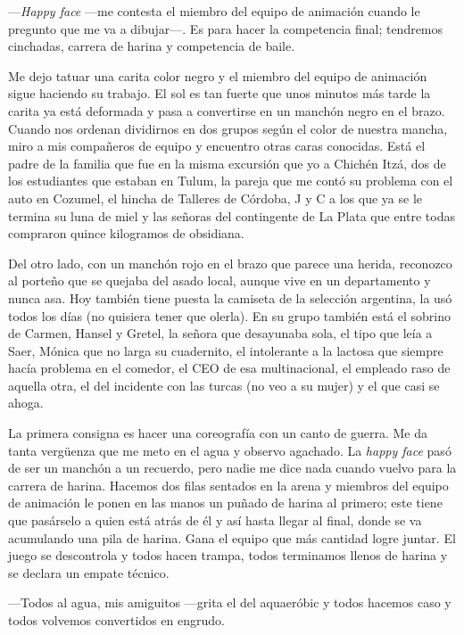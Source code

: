 \documentclass[12pt,twoside,openright,a5paper]{book}
\begin{document}
---\emph{Happy face} ---me contesta el miembro del equipo de animación cuando
le pregunto que me va a dibujar---. Es para hacer la competencia final;
tendremos cinchadas, carrera de harina y competencia de baile.

Me dejo tatuar una carita color negro y el miembro del equipo de animación
sigue haciendo su trabajo. El sol es tan fuerte que unos minutos más tarde
la carita ya está deformada y pasa a convertirse en un manchón negro en el
brazo. Cuando nos ordenan dividirnos en dos grupos según el color de nuestra
mancha, miro a mis compañeros de equipo y encuentro otras caras
conocidas. Está el padre de la familia que fue en la misma excursión que
yo a Chichén Itzá, dos de los estudiantes que estaban en Tulum, la pareja
que me contó su problema con el auto en Cozumel, el hincha de Talleres
de Córdoba, J y C a los que ya se le termina su luna de miel y las señoras
del contingente de La Plata que entre todas compraron quince kilogramos de obsidiana.

Del otro lado, con un manchón rojo en el brazo que parece una herida,
reconozco al porteño que se quejaba del asado local, aunque vive en
un departamento y nunca asa. Hoy también tiene puesta la camiseta de
la selección argentina, la usó todos los días (no quisiera tener que
olerla). En su grupo también está el sobrino de Carmen, Hansel y Gretel,
la señora que desayunaba sola, el tipo que leía a Saer, Mónica que no
larga su cuadernito, el intolerante a la lactosa que siempre hacía problema
en el comedor, el CEO de esa multinacional, el empleado raso de aquella otra,
el del incidente con las turcas (no veo a su mujer) y el que casi se ahoga.

La primera consigna es hacer una coreografía con un canto de guerra. Me da
tanta vergüenza que me meto en el agua y observo agachado. La \emph{happy face} pasó
de ser un manchón a un recuerdo, pero nadie me dice nada cuando vuelvo para
la carrera de harina. Hacemos dos filas sentados en la arena y miembros del
equipo de animación le ponen en las manos un puñado de harina al primero;
este tiene que pasárselo a quien está atrás de él y así hasta llegar
al final, donde se va acumulando una pila de harina. Gana el equipo que
más cantidad logre juntar. El juego se descontrola y todos hacen trampa,
todos terminamos llenos de harina y se declara un empate técnico. 

---Todos
al agua, mis amiguitos ---grita el del aquaeróbic y todos hacemos caso y todos
volvemos convertidos en engrudo.
\end{document}

